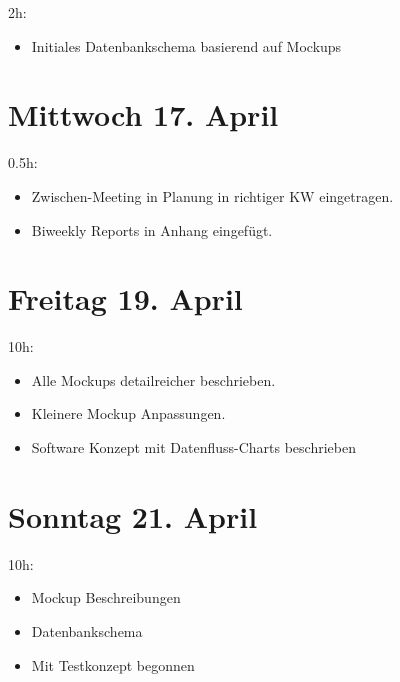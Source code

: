 2h:

\begin{itemize}
  \tightlist
  \item
        Initiales Datenbankschema basierend auf Mockups
\end{itemize}

\section{Mittwoch 17. April}\label{mittwoch-17.april}

0.5h:

\begin{itemize}
  \tightlist
  \item
    Zwischen-Meeting in Planung in richtiger KW eingetragen.
  \item
    Biweekly Reports in Anhang eingefügt.
\end{itemize}

\section{Freitag 19. April}\label{freitag-19.april}

10h:

\begin{itemize}
  \tightlist
  \item
    Alle Mockups detailreicher beschrieben.
  \item
    Kleinere Mockup Anpassungen.
  \item
    Software Konzept mit Datenfluss-Charts beschrieben
\end{itemize}

\section{Sonntag 21. April}\label{sonntag-20.april}

10h:

\begin{itemize}
  \tightlist
  \item
    Mockup Beschreibungen
  \item
    Datenbankschema
  \item
    Mit Testkonzept begonnen
\end{itemize}
